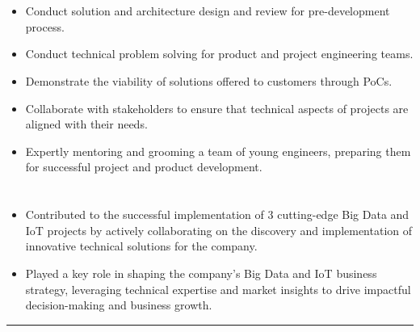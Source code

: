 \documentclass[12pt]{res} %
\begin{document}
\begin{resume}
\begin{minipage}[t]{0.48\linewidth}
	\section{}
	\vspace{10pt}
	\begin{itemize}
		\item Conduct solution and architecture design and review for pre-development process.
		\item Conduct technical problem solving for product and project engineering teams.
		\item Demonstrate the viability of solutions offered to customers through PoCs.
		\item Collaborate with stakeholders to ensure that technical aspects of projects are aligned with their needs.
		\item Expertly mentoring and grooming a team of young engineers, preparing them for successful project and product development.
	\end{itemize}
\end{minipage}%
\hfill
\begin{minipage}[t]{0.48\linewidth}
	\section{}
	\vspace{10pt}
	\begin{itemize}
		\item Contributed to the successful implementation of 3 cutting-edge Big Data and IoT projects by actively collaborating on the discovery and implementation of innovative technical solutions for the company.
		\item Played a key role in shaping the company's Big Data and IoT business strategy, leveraging technical expertise and market insights to drive impactful decision-making and business growth.
	\end{itemize}
\end{minipage}

\begin{center}
	\rule{0.5\textwidth}{.2pt}
\end{center}


\end{resume}
\end{document}
